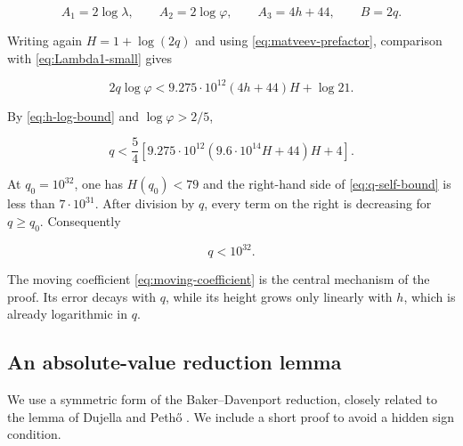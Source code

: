 \begin{equation}
 A_1=2\log\lambda,
 \qquad
 A_2=2\log\varphi,
 \qquad
 A_3=4h+44,
 \qquad
 B=2q.
 \label{eq:moving-height-parameters}
\end{equation}

Writing again $H=1+\log(2q)$ and using
\cref{eq:matveev-prefactor}, comparison with
\cref{eq:Lambda1-small} gives

\begin{equation}
 2q\log\varphi
 <9.275\mathbin{\cdot}10^{12}(4h+44)H+\log21.
 \label{eq:q-h-comparison}
\end{equation}

By \cref{eq:h-log-bound} and $\log\varphi>2/5$,

\begin{equation}
 q<\frac54\left[
 9.275\mathbin{\cdot}10^{12}
 \left(9.6\mathbin{\cdot}10^{14}H+44\right)H+4
 \right].
 \label{eq:q-self-bound}
\end{equation}

At $q_0=10^{32}$, one has $H(q_0)<79$ and the right-hand side of
\cref{eq:q-self-bound} is less than $7\mathbin{\cdot}10^{31}$. After
division by $q$, every term on the right is decreasing for
$q\geqslant q_0$. Consequently

\begin{equation}
 q<10^{32}.
 \label{eq:q-1e32}
\end{equation}

The moving coefficient \cref{eq:moving-coefficient} is the central
mechanism of the proof. Its error decays with $q$, while its height grows
only linearly with $h$, which is already logarithmic in $q$.

\subsection{An absolute-value reduction lemma}

We use a symmetric form of the Baker--Davenport reduction, closely related
to the lemma of Dujella and Peth\H{o} \cite{DujellaPetho1998}. We include a
short proof to avoid a hidden sign condition.

